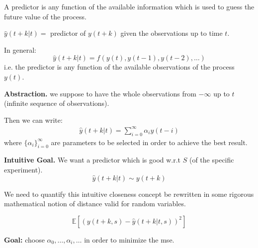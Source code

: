 A predictor is any function of the available information which is used to guess the future value of the process.

$\hat{y}(t + k | t) =$ predictor of $y(t + k)$ given the observations up to time $t$.

In general: 
$$\hat{y}(t + k | t) = f ( y(t), y(t-1), y(t-2),\ldots)$$
i.e. the predictor is any function of the available observations of the process $y(t)$.

\textbf{Abstraction.} we suppose to have the whole observations from $-\infty$ up to $t$ (infinite sequence of observations).

Then we can write:
\begin{align*}
	\hat{y}(t + k | t)=\sum_{i=0}^{\infty}\alpha_i y(t-i)
\end{align*}
where ${\{\alpha_i\}}_{i=0}^\infty$ are parameters to be selected in order to achieve the best result.

\textbf{Intuitive Goal.} 
We want a predictor which is good w.r.t $S$ (of the specific experiment).
$$\hat{y}(t + k | t)\sim y(t+k) $$

We need to quantify this intuitive closeness concept be rewritten in some rigorous mathematical notion of distance valid for random variables.

\begin{definition}
	\[
		\mathbb{E}[(y(t+k,s)-\hat{y}(t+k|t,s))^2]
	\]
\end{definition}

\textbf{Goal:} choose $\alpha_0,\ldots,\alpha_i,\ldots$ in order to minimize the \gls{mse}.